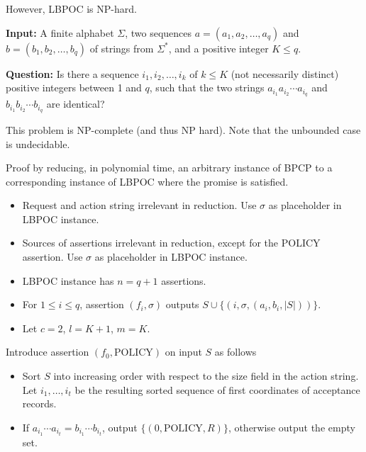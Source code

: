 \documentclass[landscape]{slides}
\begin{document}
However, LBPOC is NP-hard.

\stopslide

\textbf{Input:} A finite alphabet $\Sigma$, two sequences $a = (a_1, a_2, \ldots, a_q)$ and $b = (b_1, b_2, \ldots, b_q)$ of strings from $\Sigma^{*}$, and a positive integer $K \le q$.

\textbf{Question:} Is there a sequence $i_1, i_2, \ldots, i_k$ of $k \le K$ (not necessarily distinct) positive integers between 1 and $q$, such that the two strings $a_{i_1} a_{i_2} \cdots a_{i_q}$ and $b_{i_1} b_{i_2} \cdots b_{i_q}$ are identical?

This problem is NP-complete (and thus NP hard). Note that the unbounded case is undecidable.

\stopslide


Proof by reducing, in polynomial time, an arbitrary instance of BPCP to a corresponding instance of LBPOC where the promise is satisfied.

\begin{itemize}
\item Request and action string irrelevant in reduction. Use $\sigma$ as placeholder in LBPOC instance.
\item Sources of assertions irrelevant in reduction, except for the POLICY assertion. Use $\sigma$ as placeholder in LBPOC instance.
\item LBPOC instance has $n = q + 1$ assertions.
\item For $1 \le i \le q$, assertion $(f_i, \sigma)$ outputs $S \cup \{(i, \sigma, (a_i, b_i, |S|))\}$.
\item Let $c = 2$, $l = K + 1$, $m = K$.
\end{itemize}

\stopslide

Introduce assertion $(f_0, \mbox{POLICY})$ on input $S$ as follows

\begin{itemize}
\item Sort $S$ into increasing order with respect to the size field in the action string. Let $i_1, \ldots, i_t$ be the resulting sorted sequence of first coordinates of acceptance records.
\item If $a_{i_1} \cdots a_{i_t} = b_{i_1} \cdots b_{i_t}$, output $\{(0, \mbox{POLICY}, R)\}$, otherwise output the empty set.
\end{itemize}
\end{document}
